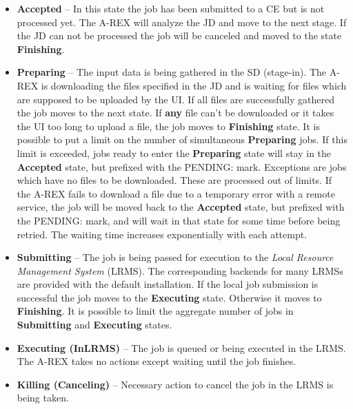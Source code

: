 \documentclass{article}                            %
\begin{document}
\begin{itemize}

\item \textbf{Accepted} -- In this state the job has been submitted to
  a CE but is not processed yet. The A-REX will analyze the JD and
  move to the next stage. If the JD can not be processed the job will
  be canceled and moved to the state \textbf{Finishing}.

\item \textbf{Preparing} -- The input data is being gathered in the SD
  (stage-in).  The A-REX is downloading the files specified in the JD
  and is waiting for files which are supposed to be uploaded by the
  UI. If all files are successfully gathered the job moves to the next
  state. If \textbf{any} file can't be downloaded or it takes the UI
  too long to upload a file, the job moves to \textbf{Finishing}
  state. It is possible to put a limit on the number of simultaneous
  \textbf{Preparing} jobs.  If this limit is exceeded, jobs ready to
  enter the \textbf{Preparing} state will stay in the
  \textbf{Accepted} state, but prefixed with the PENDING:
  mark. Exceptions are jobs which have no files to be
  downloaded. These are processed out of limits. If the A-REX fails to
  download a file due to a temporary error with a remote service, the
  job will be moved back to the \textbf{Accepted} state, but prefixed
  with the PENDING: mark, and will wait in that state for some time
  before being retried. The waiting time increases exponentially with
  each attempt.

\item \textbf{Submitting} -- The job is being passed for execution to
  the \emph{Local Resource Management System} (LRMS). The
  corresponding backends for many LRMSs are provided with the default
  installation.  If the local job submission is successful the job
  moves to the \textbf{Executing} state. Otherwise it moves to
  \textbf{Finishing}. It is possible to limit the aggregate number of
  jobs in \textbf{Submitting} and \textbf{Executing} states.

\item \textbf{Executing (InLRMS)} -- The job is queued or being executed in the
  LRMS.  The A-REX takes no actions except waiting until the job
  finishes.

\item \textbf{Killing (Canceling)} -- Necessary action to cancel the job in the
  LRMS is being taken.


\end{itemize}
\end{document}
